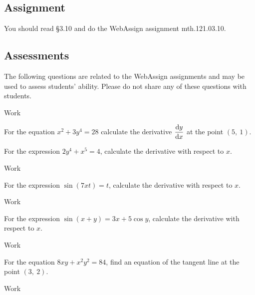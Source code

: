 \documentclass[12pt,addpoints, answers, fleqn]{exam}
\begin{document}
\subsection{Assignment}
You should read \S  3.10 and do the WebAssign assignment mth.121.03.10.
\vfill
\pagebreak
\begin{teacher}
\subsection{Assessments}
The following questions are related to the WebAssign assignments and may be used to assess students' ability. Please do not share any of these questions with students.
\begin{questions}		
\question 	%
\begin{solution}
Work
\end{solution}
For the equation $x^2 + 3y^4 = 28$ calculate the derivative $\displaystyle \frac{{\rm{d}}y}{{\rm{d}}x}$ at the point $\left(5, \ 1 \right)$.

\question 	%
For the expression $2y^4 + x^5 = 4$, calculate the derivative with respect to $x$.
\begin{solution}
Work
\end{solution}

\question 	%

For the expression $\sin \left( 7xt \right) = t$, calculate the derivative with respect to $x$.
\begin{solution}
Work
\end{solution}

\question 	%

For the expression $\sin \left(x + y\right) = 3x + 5 \cos y$, calculate the derivative with respect to $x$.

\begin{solution}
Work
\end{solution}

\question 	%

For the equation $8xy + x^2y^2 = 84$, find an equation of the tangent line at the point $\left(3, \ 2 \right)$.
\begin{solution}
Work
\end{solution}



\end{questions}
\end{teacher}
\end{document}
